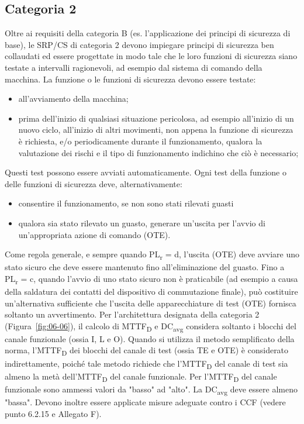 \subsection{Categoria 2}
\label{subsec:06-2-5}
Oltre ai requisiti della categoria B (es. l'applicazione dei principi di sicurezza di base), le SRP/CS di categoria 2 devono impiegare principi di sicurezza ben collaudati ed essere progettate in modo tale che le loro funzioni di sicurezza siano testate a intervalli ragionevoli, ad esempio dal sistema di comando della macchina. La funzione o le funzioni di sicurezza devono essere testate:
\begin{itemize}
    \item all'avviamento della macchina;
    \item prima dell'inizio di qualsiasi situazione pericolosa, ad esempio all'inizio di un nuovo ciclo, all'inizio di altri movimenti, non appena la funzione di sicurezza è richiesta, e/o periodicamente durante il funzionamento, qualora la valutazione dei rischi e il tipo di funzionamento indichino che ciò è necessario;
\end{itemize}

Questi test possono essere avviati automaticamente. Ogni test della funzione o delle funzioni di sicurezza deve, alternativamente:
\begin{itemize}
    \item consentire il funzionamento, se non sono stati rilevati guasti
    \item qualora sia stato rilevato un guasto, generare un'uscita per l'avvio di un'appropriata azione di comando (OTE).
\end{itemize}

Come regola generale, e sempre quando PL\textsubscript{r} = d, l'uscita (OTE) deve avviare uno stato sicuro che deve essere mantenuto fino all'eliminazione del guasto. Fino a PL\textsubscript{r} = c, quando l'avvio di uno stato sicuro non è praticabile (ad esempio a causa della saldatura dei contatti del dispositivo di commutazione finale), può costituire un'alternativa sufficiente che l'uscita delle apparecchiature di test (OTE) fornisca soltanto un avvertimento.
Per l'architettura designata della categoria 2 (Figura~\ref{fig:06-06}), il calcolo di MTTF\textsubscript{D} e DC\textsubscript{avg} considera soltanto i blocchi del canale funzionale (ossia I, L e O). Quando si utilizza il metodo semplificato della norma, l'MTTF\textsubscript{D} dei blocchi del canale di test (ossia TE e OTE) è considerato indirettamente, poiché tale metodo richiede che l'MTTF\textsubscript{D} del canale di test sia almeno la metà dell'MTTF\textsubscript{D} del canale funzionale. Per l'MTTF\textsubscript{D} del canale funzionale sono ammessi valori da "basso" ad "alto". La DC\textsubscript{avg} deve essere almeno "bassa". Devono inoltre essere applicate misure adeguate contro i CCF (vedere punto 6.2.15 e Allegato F).

